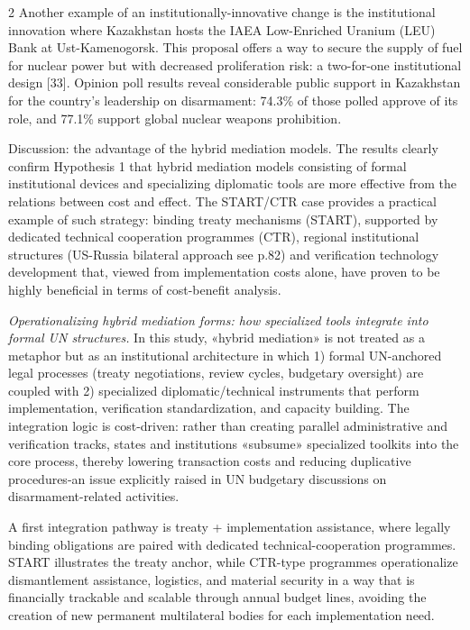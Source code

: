 \begin{multicols}{2}
Another example of an institutionally-innovative change is the
institutional innovation where Kazakhstan hosts the IAEA Low-Enriched
Uranium (LEU) Bank at Ust-Kamenogorsk. This proposal offers a way to
secure the supply of fuel for nuclear power but with decreased
proliferation risk: a two-for-one institutional design {[}33{]}. Opinion
poll results reveal considerable public support in Kazakhstan for the
country's leadership on disarmament: 74.3\% of those polled approve of
its role, and 77.1\% support global nuclear weapons prohibition.

Discussion: the advantage of the hybrid mediation models. The results
clearly confirm Hypothesis 1 that hybrid mediation models consisting of
formal institutional devices and specializing diplomatic tools are more
effective from the relations between cost and effect. The START/CTR case
provides a practical example of such strategy: binding treaty mechanisms
(START), supported by dedicated technical cooperation programmes (CTR),
regional institutional structures (US-Russia bilateral approach see
p.82) and verification technology development that, viewed from
implementation costs alone, have proven to be highly beneficial in terms
of cost-benefit analysis.

\emph{Operationalizing hybrid mediation forms: how specialized tools
integrate into formal UN structures.} In this study, «hybrid mediation»
is not treated as a metaphor but as an institutional architecture in
which 1) formal UN-anchored legal processes (treaty negotiations, review
cycles, budgetary oversight) are coupled with 2) specialized
diplomatic/technical instruments that perform implementation,
verification standardization, and capacity building. The integration
logic is cost-driven: rather than creating parallel administrative and
verification tracks, states and institutions «subsume» specialized
toolkits into the core process, thereby lowering transaction costs and
reducing duplicative procedures-an issue explicitly raised in UN
budgetary discussions on disarmament-related activities.

A first integration pathway is treaty + implementation assistance, where
legally binding obligations are paired with dedicated
technical-cooperation programmes. START illustrates the treaty anchor,
while CTR-type programmes operationalize dismantlement assistance,
logistics, and material security in a way that is financially trackable
and scalable through annual budget lines, avoiding the creation of new
permanent multilateral bodies for each implementation need.


\end{multicols}

